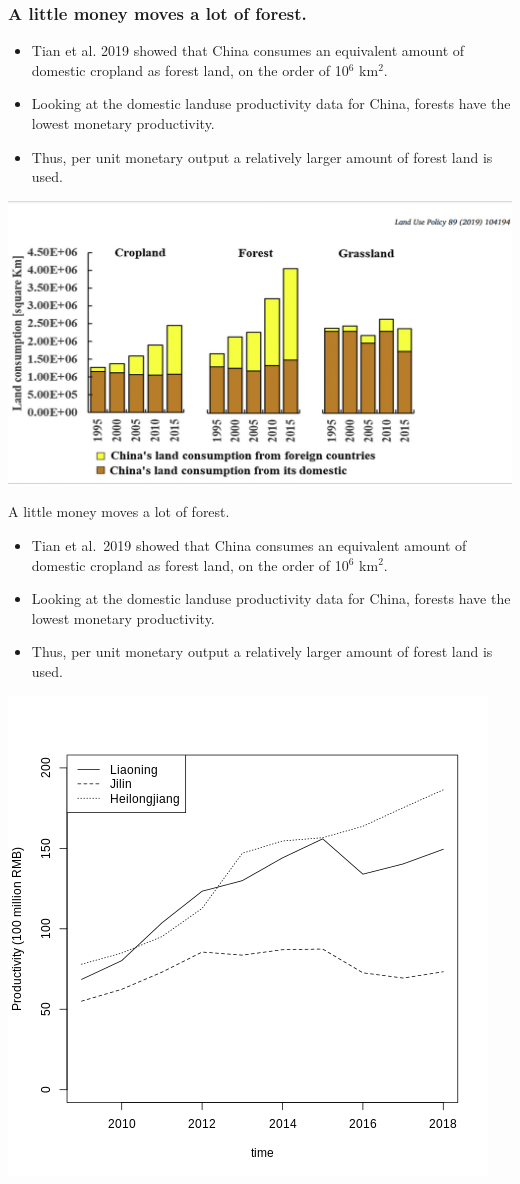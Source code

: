 \begin{frame}
  \frametitle{A little money moves a lot of forest. }

  \begin{itemize}
  \item Tian et al. 2019 showed that China consumes an equivalent amount
    of domestic cropland as forest land, on the order of 10$^6$ km$^2$.
  \item Looking at the domestic landuse productivity data for China,
    forests have the lowest monetary productivity.
  \item Thus, per unit monetary output a relatively larger amount of
    forest land is used.
  \end{itemize}

\begin{center}\includegraphics[width=0.5\linewidth]{images/Tian_2019_Fig1} \end{center}

\end{frame}

\begin{frame}{A little money moves a lot of forest.}

\begin{itemize}
\item
  Tian et al.~2019 showed that China consumes an equivalent amount of
  domestic cropland as forest land, on the order of 10\(^6\) km\(^2\).
\item
  Looking at the domestic landuse productivity data for China, forests
  have the lowest monetary productivity.
\item
  Thus, per unit monetary output a relatively larger amount of forest
  land is used.
\end{itemize}

\begin{center}\includegraphics[width=0.5\linewidth]{images/prod_for_time_nec} \end{center}

\end{frame}

